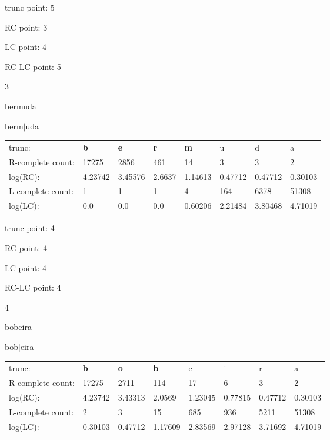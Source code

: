 \documentclass{article}
\begin{document}
trunc point: 5

RC point: 3

LC point: 4

RC-LC point: 5

\vspace{3em}



3

bermuda

berm$|$uda

\vspace{1em}

\begin{tabular}{l|lllllll}

trunc: & {\color{red}\bf b} & {\color{red}\bf e} & {\color{red}\bf r} & {\color{red}\bf m} & u & d & a \\ 
R-complete count: & 17275 & 2856 & 461 & 14 & 3 & 3 & 2 \\ 
log(RC): & 4.23742 & 3.45576 & 2.6637 & 1.14613 & 0.47712 & 0.47712 & 0.30103 \\ 
L-complete count: & 1 & 1 & 1 & 4 & 164 & 6378 & 51308 \\ 
log(LC): & 0.0 & 0.0 & 0.0 & 0.60206 & 2.21484 & 3.80468 & 4.71019 \\ 
\end{tabular}

trunc point: 4

RC point: 4

LC point: 4

RC-LC point: 4

\vspace{3em}



4

bobeira

bob$|$eira

\vspace{1em}

\begin{tabular}{l|lllllll}

trunc: & {\color{red}\bf b} & {\color{red}\bf o} & {\color{red}\bf b} & e & i & r & a \\ 
R-complete count: & 17275 & 2711 & 114 & 17 & 6 & 3 & 2 \\ 
log(RC): & 4.23742 & 3.43313 & 2.0569 & 1.23045 & 0.77815 & 0.47712 & 0.30103 \\ 
L-complete count: & 2 & 3 & 15 & 685 & 936 & 5211 & 51308 \\ 
log(LC): & 0.30103 & 0.47712 & 1.17609 & 2.83569 & 2.97128 & 3.71692 & 4.71019 \\ 
\end{tabular}
\end{document}
